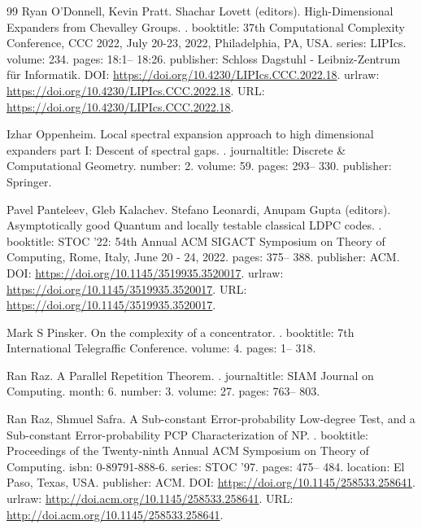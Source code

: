\documentclass[10pt,a4paper]{article}
\theoremstyle{definition}
\theoremstyle{remark}
\numberwithin{equation}{section}
\begin{document}
\begin{thebibliography}{99}
Ryan O'Donnell, Kevin Pratt.
Shachar Lovett (editors).
\newblock High-Dimensional Expanders from Chevalley Groups.
.
\newblock booktitle: 37th Computational Complexity Conference, {CCC} 2022, July 20-23, 2022, Philadelphia, PA, {USA}.
\newblock series: LIPIcs.
\newblock volume: 234.
\newblock pages: 18:1-- 18:26.
\newblock publisher: Schloss Dagstuhl - Leibniz-Zentrum für Informatik.
\newblock DOI: \url{https://doi.org/10.4230/LIPIcs.CCC.2022.18}.
\newblock urlraw: \url{https://doi.org/10.4230/LIPIcs.CCC.2022.18}.
\newblock URL: \url{https://doi.org/10.4230/LIPIcs.CCC.2022.18}.

Izhar Oppenheim.
\newblock Local spectral expansion approach to high dimensional expanders part I: Descent of spectral gaps.
.
\newblock journaltitle: Discrete \& Computational Geometry.
\newblock number: 2.
\newblock volume: 59.
\newblock pages: 293-- 330.
\newblock publisher: Springer.

Pavel Panteleev, Gleb Kalachev.
Stefano Leonardi, Anupam Gupta (editors).
\newblock Asymptotically good Quantum and locally testable classical {LDPC} codes.
.
\newblock booktitle: {STOC} '22: 54th Annual {ACM} {SIGACT} Symposium on Theory of Computing, Rome, Italy, June 20 - 24, 2022.
\newblock pages: 375-- 388.
\newblock publisher: ACM.
\newblock DOI: \url{https://doi.org/10.1145/3519935.3520017}.
\newblock urlraw: \url{https://doi.org/10.1145/3519935.3520017}.
\newblock URL: \url{https://doi.org/10.1145/3519935.3520017}.

Mark S Pinsker.
\newblock On the complexity of a concentrator.
.
\newblock booktitle: 7th International Telegraffic Conference.
\newblock volume: 4.
\newblock pages: 1-- 318.

Ran Raz.
\newblock A Parallel Repetition Theorem.
.
\newblock journaltitle: SIAM Journal on Computing.
\newblock month: 6.
\newblock number: 3.
\newblock volume: 27.
\newblock pages: 763-- 803.

Ran Raz, Shmuel Safra.
\newblock A Sub-constant Error-probability Low-degree Test, and a Sub-constant Error-probability PCP Characterization of NP.
.
\newblock booktitle: Proceedings of the Twenty-ninth Annual ACM Symposium on Theory of Computing.
\newblock isbn: 0-89791-888-6.
\newblock series: STOC '97.
\newblock pages: 475-- 484.
\newblock location: El Paso, Texas, USA.
\newblock publisher: ACM.
\newblock DOI: \url{https://doi.org/10.1145/258533.258641}.
\newblock urlraw: \url{http://doi.acm.org/10.1145/258533.258641}.
\newblock URL: \url{http://doi.acm.org/10.1145/258533.258641}.


\end{thebibliography}
\end{document}
